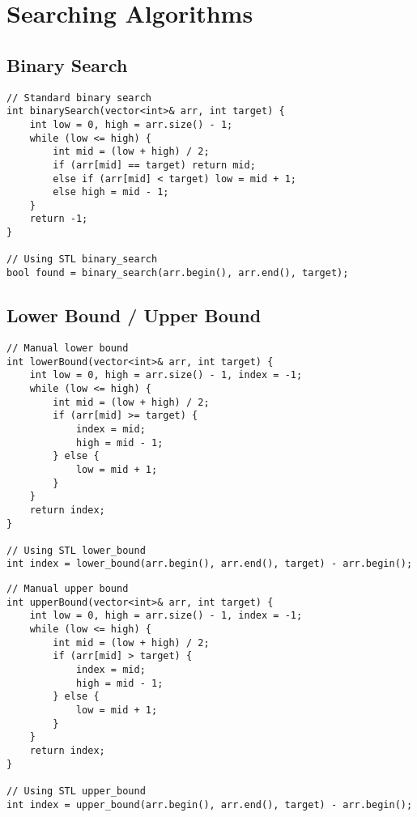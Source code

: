 \documentclass[11pt,a4paper]{article}
\begin{document}
\newpage
\section{Searching Algorithms}

\subsection{Binary Search}
\begin{lstlisting}[caption={Binary Search Implementation}]
// Standard binary search
int binarySearch(vector<int>& arr, int target) {
    int low = 0, high = arr.size() - 1;
    while (low <= high) {
        int mid = (low + high) / 2;
        if (arr[mid] == target) return mid;
        else if (arr[mid] < target) low = mid + 1;
        else high = mid - 1;
    }
    return -1;
}

// Using STL binary_search
bool found = binary_search(arr.begin(), arr.end(), target);
\end{lstlisting}

\subsection{Lower Bound / Upper Bound}
\begin{lstlisting}[caption={Lower Bound Implementation}]
// Manual lower bound
int lowerBound(vector<int>& arr, int target) {
    int low = 0, high = arr.size() - 1, index = -1;
    while (low <= high) {
        int mid = (low + high) / 2;
        if (arr[mid] >= target) {
            index = mid;
            high = mid - 1;
        } else {
            low = mid + 1;
        }
    }
    return index;
}

// Using STL lower_bound
int index = lower_bound(arr.begin(), arr.end(), target) - arr.begin();
\end{lstlisting}

\newpage

\begin{lstlisting}[caption={Upper Bound Implementation}]
// Manual upper bound
int upperBound(vector<int>& arr, int target) {
    int low = 0, high = arr.size() - 1, index = -1;
    while (low <= high) {
        int mid = (low + high) / 2;
        if (arr[mid] > target) {
            index = mid;
            high = mid - 1;
        } else {
            low = mid + 1;
        }
    }
    return index;
}

// Using STL upper_bound
int index = upper_bound(arr.begin(), arr.end(), target) - arr.begin();
\end{lstlisting}
\end{document}
